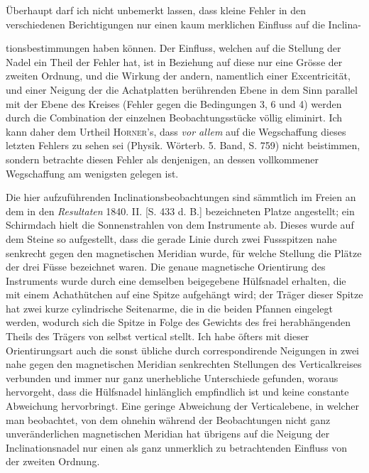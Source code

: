 Überhaupt darf ich nicht unbemerkt lassen, dass kleine Fehler in den verschiedenen Berichtigungen nur einen kaum merklichen Einfluss auf die Inclina-
\par\clearpage
{}
\noindent tionsbestimmungen haben können. Der Einfluss, welchen auf die Stellung der Nadel ein Theil der Fehler hat, ist in Beziehung auf diese nur eine Grösse der zweiten Ordnung, und die Wirkung der andern, namentlich einer Excentricität, und einer Neigung der die Achatplatten berührenden Ebene in dem Sinn parallel mit der Ebene des Kreises (Fehler gegen die Bedingungen 3, 6 und 4) werden durch die Combination der einzelnen Beobachtungsstücke völlig eliminirt. Ich kann daher dem Urtheil \textsc{Horner}'s, dass \textit{vor allem} auf die Wegschaffung dieses letzten Fehlers zu sehen sei (Physik. Wörterb. 5. Band, S. 759) nicht beistimmen, sondern betrachte diesen Fehler als denjenigen, an dessen vollkommener Wegschaffung am wenigsten gelegen ist.

Die hier aufzuführenden Inclinationsbeobachtungen sind sämmtlich im Freien an dem in den \textit{Resultaten} 1840. II. [S. 433 d. B.] bezeichneten Platze angestellt; ein Schirmdach hielt die Sonnenstrahlen von dem Instrumente ab. Dieses wurde auf dem Steine so aufgestellt, dass die gerade Linie durch zwei Fussspitzen nahe senkrecht gegen den magnetischen Meridian wurde, für welche Stellung die Plätze der drei Füsse bezeichnet waren. Die genaue magnetische Orientirung des Instruments wurde durch eine demselben beigegebene Hülfsnadel erhalten, die mit einem Achathütchen auf eine Spitze aufgehängt wird; der Träger dieser Spitze hat zwei kurze cylindrische Seitenarme, die in die beiden Pfannen eingelegt werden, wodurch sich die Spitze in Folge des Gewichts des frei herabhängenden Theils des Trägers von selbst vertical stellt. Ich habe öfters mit dieser Orientirungsart auch die sonst übliche durch correspondirende Neigungen in zwei nahe gegen den magnetischen Meridian senkrechten Stellungen des Verticalkreises verbunden und immer nur ganz unerhebliche Unterschiede gefunden, woraus hervorgeht, dass die Hülfsnadel hinlänglich empfindlich ist und keine constante Abweichung hervorbringt. Eine geringe Abweichung der Verticalebene, in welcher man beobachtet, von dem ohnehin während der Beobachtungen nicht ganz unveränderlichen magnetischen Meridian hat übrigens auf die Neigung der Inclinationsnadel nur einen als ganz unmerklich zu betrachtenden Einfluss von der zweiten Ordnung.

